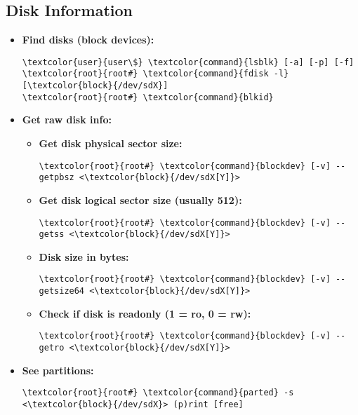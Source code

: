 \documentclass[10pt, a4paper, onecolumn, oneside, titlepage, openany]{book}
\begin{document}
\subsection{Disk Information}
\begin{itemize}
    \item \textbf{Find disks (block devices):}
\begin{Verbatim}[commandchars=\\\{\}]
\textcolor{user}{user\$} \textcolor{command}{lsblk} [-a] [-p] [-f]
\textcolor{root}{root#} \textcolor{command}{fdisk -l} [\textcolor{block}{/dev/sdX}]
\textcolor{root}{root#} \textcolor{command}{blkid}
\end{Verbatim}
    \item \textbf{Get raw disk info:}
    \begin{itemize}
        \item \textbf{Get disk physical sector size:}
\begin{Verbatim}[commandchars=\\\{\}]
\textcolor{root}{root#} \textcolor{command}{blockdev} [-v] --getpbsz <\textcolor{block}{/dev/sdX[Y]}>
\end{Verbatim}
        \item \textbf{Get disk logical sector size (usually 512):}
\begin{Verbatim}[commandchars=\\\{\}]
\textcolor{root}{root#} \textcolor{command}{blockdev} [-v] --getss <\textcolor{block}{/dev/sdX[Y]}>
\end{Verbatim}
        \item \textbf{Disk size in bytes:}
\begin{Verbatim}[commandchars=\\\{\}]
\textcolor{root}{root#} \textcolor{command}{blockdev} [-v] --getsize64 <\textcolor{block}{/dev/sdX[Y]}>
\end{Verbatim}
    \item \textbf{Check if disk is readonly (1 = ro, 0 = rw):}
\begin{Verbatim}[commandchars=\\\{\}]
\textcolor{root}{root#} \textcolor{command}{blockdev} [-v] --getro <\textcolor{block}{/dev/sdX[Y]}>
\end{Verbatim}
    \end{itemize}
    \item \textbf{See partitions:}
\begin{Verbatim}[commandchars=\\\{\}]
\textcolor{root}{root#} \textcolor{command}{parted} -s <\textcolor{block}{/dev/sdX}> (p)rint [free]
\end{Verbatim}
\end{itemize}
\end{document}
